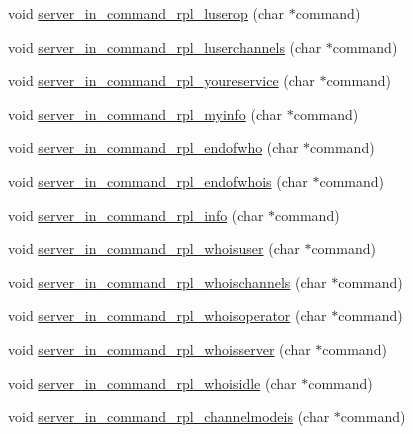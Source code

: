 \begin{DoxyCompactItemize}
void \hyperlink{G-2313-06-P2__client__function__handlers_8c_aa885b5d729d8a920a1c38678abdbe6b7}{server\+\_\+in\+\_\+command\+\_\+rpl\+\_\+luserop} (char $\ast$command)
\item 
void \hyperlink{G-2313-06-P2__client__function__handlers_8c_ae53c29cff5b1b8b3981be92c317cf29d}{server\+\_\+in\+\_\+command\+\_\+rpl\+\_\+luserchannels} (char $\ast$command)
\item 
void \hyperlink{G-2313-06-P2__client__function__handlers_8c_a9a54a1989e86596904bc4d1c2618ba84}{server\+\_\+in\+\_\+command\+\_\+rpl\+\_\+youreservice} (char $\ast$command)
\item 
void \hyperlink{G-2313-06-P2__client__function__handlers_8c_aa4c4d377b1cde9f0b40997a54c81c3de}{server\+\_\+in\+\_\+command\+\_\+rpl\+\_\+myinfo} (char $\ast$command)
\item 
void \hyperlink{G-2313-06-P2__client__function__handlers_8c_a441993de1d4be974fab21e17aacc553e}{server\+\_\+in\+\_\+command\+\_\+rpl\+\_\+endofwho} (char $\ast$command)
\item 
void \hyperlink{G-2313-06-P2__client__function__handlers_8c_a56185c77cfea8620c1ce413a44865bc4}{server\+\_\+in\+\_\+command\+\_\+rpl\+\_\+endofwhois} (char $\ast$command)
\item 
void \hyperlink{G-2313-06-P2__client__function__handlers_8c_a6477df39f199931be3274e311a18b276}{server\+\_\+in\+\_\+command\+\_\+rpl\+\_\+info} (char $\ast$command)
\item 
void \hyperlink{G-2313-06-P2__client__function__handlers_8c_af2190c9ca68abe019cde6f3a18e380c2}{server\+\_\+in\+\_\+command\+\_\+rpl\+\_\+whoisuser} (char $\ast$command)
\item 
void \hyperlink{G-2313-06-P2__client__function__handlers_8c_a7ed4d1bd7f485fe7c6d26bd1d8eef662}{server\+\_\+in\+\_\+command\+\_\+rpl\+\_\+whoischannels} (char $\ast$command)
\item 
void \hyperlink{G-2313-06-P2__client__function__handlers_8c_a890fb67530ca5c1f5c14da877fc9ba21}{server\+\_\+in\+\_\+command\+\_\+rpl\+\_\+whoisoperator} (char $\ast$command)
\item 
void \hyperlink{G-2313-06-P2__client__function__handlers_8c_a27bc970f66b7e5a2f3806853c3fa156f}{server\+\_\+in\+\_\+command\+\_\+rpl\+\_\+whoisserver} (char $\ast$command)
\item 
void \hyperlink{G-2313-06-P2__client__function__handlers_8c_ada14de5a081899ca2b5eccbfb9779d62}{server\+\_\+in\+\_\+command\+\_\+rpl\+\_\+whoisidle} (char $\ast$command)
\item 
void \hyperlink{G-2313-06-P2__client__function__handlers_8c_a23ae57a558e401f83bc03209efb34be2}{server\+\_\+in\+\_\+command\+\_\+rpl\+\_\+channelmodeis} (char $\ast$command)

\end{DoxyCompactItemize}
